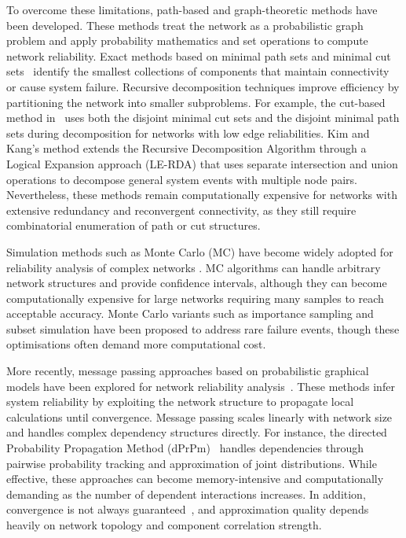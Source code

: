 \documentclass[preprint,12pt]{elsarticle}
\begin{document}
To overcome these limitations, path-based and graph-theoretic methods have been developed. These methods treat the network as a probabilistic graph problem and apply probability mathematics and set operations to compute network reliability. Exact methods based on minimal path sets and minimal cut sets~\cite{kumar_composite_2018,li_cuttie_2005,billinton_network_1992,liu_improved_2012} identify the smallest collections of components that maintain connectivity or cause system failure. Recursive decomposition techniques improve efficiency by partitioning the network into smaller subproblems. For example, the cut-based method in~\cite{liu_improved_2012} uses both the disjoint minimal cut sets and the disjoint minimal path sets during decomposition for networks with low edge reliabilities. Kim and Kang's method \cite{kim_network_2013} extends the Recursive Decomposition Algorithm through a Logical Expansion approach (LE-RDA) that uses separate intersection and union operations to decompose general system events with multiple node pairs. Nevertheless, these methods remain computationally expensive for networks with extensive redundancy and reconvergent connectivity, as they still require combinatorial enumeration of path or cut structures.

Simulation methods such as Monte Carlo (MC) have become widely adopted for reliability analysis of complex networks \cite{fishman_comparison_1986}. MC algorithms can handle arbitrary network structures and provide confidence intervals, although they can become computationally expensive for large networks requiring many samples to reach acceptable accuracy. Monte Carlo variants such as importance sampling\cite{hui_monte_2007} and subset simulation \cite{au_estimation_2001} have been proposed to address rare failure events, though these optimisations often demand more computational cost.

More recently, message passing approaches based on probabilistic graphical models have been explored for network reliability analysis~\cite{yedidia_understanding_2003,pearl_probabilistic_1988}. These methods infer system reliability by exploiting the network structure to propagate local calculations until convergence. Message passing scales linearly with network size and handles complex dependency structures directly. For instance, the directed Probability Propagation Method (dPrPm)~\cite{tong_probability_2019} handles dependencies through pairwise probability tracking and approximation of joint distributions. While effective, these approaches can become memory-intensive and computationally demanding as the number of dependent interactions increases. In addition, convergence is not always guaranteed~\cite{murphy_loopy_2013}, and approximation quality depends heavily on network topology and component correlation strength.
\end{document}
